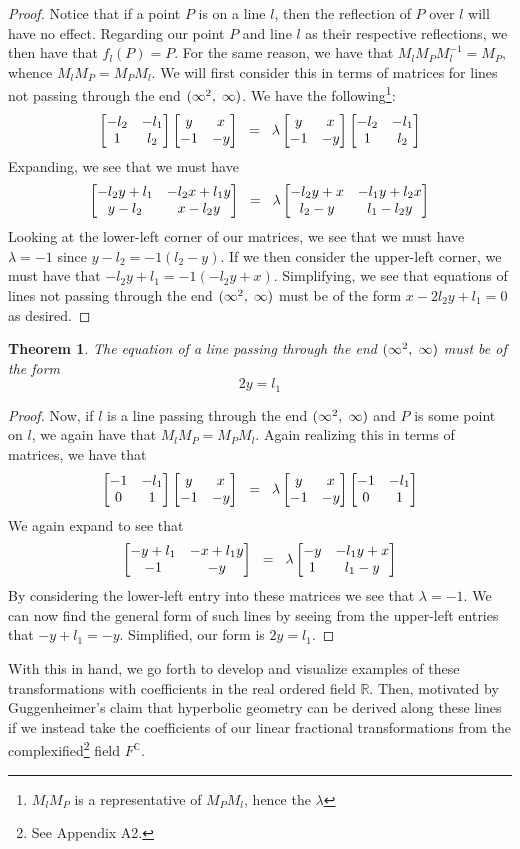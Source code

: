 \documentclass[12pt]{article}
\newcommand{\R}{\mathbb{R}}
\newcommand{\C}{\mathbb{C}}
\newcommand{\fc}{F^{\C}}
\newcommand{\inv}{^{-1}}
\newcommand{\spceq}{\hspace{2mm} = \hspace{2mm}}
\newcommand{\ttc}{, \hspace{1mm}}
\newcommand{\lftmat}[4]{\begin{bmatrix} {#1} & {#2} \\ {#3} & {#4} \end{bmatrix}}
\newcommand{\pointmat}[2]{\lftmat{{#2}}{{#1}}{-1}{-{#2}}}
\newcommand{\stanpointmat}{\pointmat{x}{y}}
\newcommand{\linenoendmat}[2]{\begin{bmatrix} -{#2} & -{#1} \\ 1 & {#2} \end{bmatrix}}
\newcommand{\stanlinenoendmat}{\linenoendmat{l_1}{l_2}}
\newcommand{\lineendmat}[2]{\begin{bmatrix} -1 & -{#1} \\ 0 & 1 \end{bmatrix}}
\newcommand{\stanlineendmat}{\lineendmat{l_1}{l_2}}
\newcommand{\specialend}{(\infty^2\ttc\infty)}
\theoremstyle{plain}
\newtheorem{theorem}{Theorem}[section]
\theoremstyle{definition}
\begin{document}
\begin{proof}Notice that if a point $P$ is on a line $l$, then the reflection of $P$ over $l$ will have no effect. Regarding our point $P$ and line $l$ as their respective reflections, we then have that $f_l(P) = P$. For the same reason, we have that $M_l M_P M_l\inv = M_P$, whence $M_l M_P = M_P M_l$. We will first consider this in terms of matrices for lines not passing through the end $\specialend$. We have the following\footnote{$M_l M_P$ is a representative of $M_P M_l$, hence the $\lambda$}:
\begin{equation} 
\stanlinenoendmat\stanpointmat \spceq \lambda \stanpointmat\stanlinenoendmat
\end{equation}	
Expanding, we see that we must have
	\[
		\lftmat{-l_2y+l_1}{-l_2x+l_1y}{y-l_2}{x-l_2y} \spceq \lambda \lftmat{-l_2y+x}{-l_1y+l_2x}{l_2-y}{l_1-l_2y}
	\]
Looking at the lower-left corner of our matrices, we see that we must have $\lambda = -1$ since $y - l_2 = -1(l_2 - y)$. If we then consider the upper-left corner, we must have that $-l_2y + l_1 = -1(-l_2y + x)$. Simplifying, we see that equations of lines not passing through the end $\specialend$ must be of the form $x - 2l_2y + l_1  = 0$ as desired.
\end{proof}




\begin{theorem} The equation of a line passing through the end $\specialend$ must be of the form 
\begin{equation}
	2y = l_1
\end{equation} 
\end{theorem}

\begin{proof} Now, if $l$ is a line passing through the end $\specialend$ and $P$ is some point on $l$, we again have that $M_l M_P = M_P M_l$. Again realizing this in terms of matrices, we have that 
\begin{equation} 
	\stanlineendmat\stanpointmat \spceq \lambda \stanpointmat\stanlineendmat
\end{equation}	
We again expand to see that 
	\[
		\lftmat{-y+l_1}{-x+l_1y}{-1}{-y} \spceq \lambda \lftmat{-y}{-l_1y+x}{1}{l_1-y}
	\]
By considering the lower-left entry into these matrices we see that $\lambda = -1$. We can now find the general form of such lines by seeing from the upper-left entries that $-y+l_1 = -y$. Simplified, our form is $2y = l_1$. 
\end{proof}

With this in hand, we go forth to develop and visualize examples of these transformations with coefficients in the real ordered field $\R$. Then, motivated by Guggenheimer's claim that hyperbolic geometry can be derived along these lines if we instead take the coefficients of our linear fractional transformations from the complexified\footnote{See Appendix A2.} field $\fc$.
\end{document}
